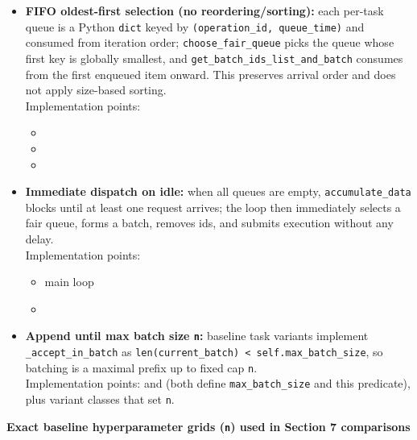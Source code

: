 \documentclass{article}
\providecommand{\tightlist}{\setlength{\itemsep}{0pt}\setlength{\parskip}{0pt}}
\begin{document}
\begin{itemize}
\tightlist
\item
  \textbf{FIFO oldest-first selection (no reordering/sorting):} each
  per-task queue is a Python \texttt{dict} keyed by
  \texttt{(operation\_id,\ queue\_time)} and consumed from iteration
  order; \texttt{choose\_fair\_queue} picks the queue whose first key is
  globally smallest, and \texttt{get\_batch\_ids\_list\_and\_batch}
  consumes from the first enqueued item onward. This preserves arrival
  order and does not apply size-based sorting.\\
  Implementation points:
  \begin{itemize}
  \tightlist
  \item
  \item
  \item
  \end{itemize}
\item
  \textbf{Immediate dispatch on idle:} when all queues are empty,
  \texttt{accumulate\_data} blocks until at least one request arrives;
  the loop then immediately selects a fair queue, forms a batch, removes
  ids, and submits execution without any delay.\\
  Implementation points:
  \begin{itemize}
  \tightlist
  \item
     main loop
  \item
  \end{itemize}
\item
  \textbf{Append until max batch size \texttt{n}:} baseline task
  variants implement \texttt{\_accept\_in\_batch} as
  \texttt{len(current\_batch)\ \textless{}\ self.max\_batch\_size}, so
  batching is a maximal prefix up to fixed cap \texttt{n}.\\
  Implementation points:
   and
   (both
  define \texttt{max\_batch\_size} and this predicate), plus variant
  classes that set \texttt{n}.
\end{itemize}

\textbf{Exact baseline hyperparameter grids (\texttt{n}) used in Section
7 comparisons}
\end{document}

